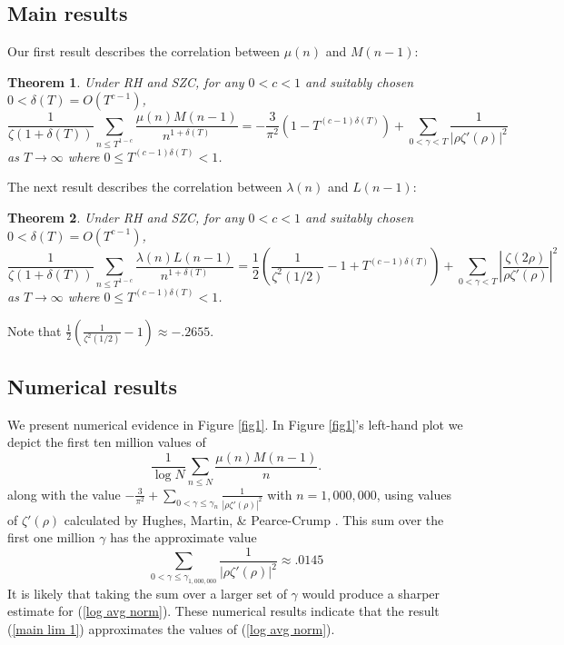 \documentclass[11pt,article]{amsart}
\numberwithin{equation}{section}
\newtheorem{thm}{Theorem}
\numberwithin{equation}{section}
\numberwithin{lemma}{section}
\numberwithin{prop}{section}
\begin{document}
\subsection{Main results}
Our first result describes the correlation between $\mu(n)$ and $M(n-1)$:
\begin{thm}
Under RH and SZC, for any $0<c<1$ and suitably chosen $0<\delta(T)=O\left(T^{c-1}\right)$, 
\begin{equation}
\frac{1}{\zeta\left(1+\delta(T)\right)}\sum_{n\leq T^{1-c}}\frac{\mu(n)M(n-1)}{n^{1+\delta(T)}}=-\frac{3}{\pi^{2}}\left(1-T^{(c-1)\delta(T)}\right)+\sum_{0<\gamma<T}\frac{1}{\left|\rho\zeta'(\rho)\right|^{2}} \label{main lim 1}
\end{equation}
as $T\rightarrow \infty$ where $0\leq T^{(c-1)\delta(T)}<1$.
\label{mainmainthm}
\end{thm}
\hspace{-.4cm}The next result describes the correlation between $\lambda(n)$ and $L(n-1)$:
\begin{thm}
Under RH and SZC, for any $0<c<1$ and suitably chosen $0<\delta(T)=O\left(T^{c-1}\right)$, 
\begin{equation}
\frac{1}{\zeta\left(1+\delta(T)\right)}\sum_{n\leq T^{1-c}}\frac{\lambda(n)L(n-1)}{n^{1+\delta(T)}}=\frac{1}{2}\left(\frac{1}{\zeta^{2}(1/2)}-1+T^{(c-1)\delta(T)}\right)+\sum_{0<\gamma<T}\left|\frac{\zeta(2\rho)}{\rho\zeta'(\rho)}\right|^{2} \label{main lim 2}
\end{equation}
as $T\rightarrow \infty$ where $0\leq T^{(c-1)\delta(T)}<1$.
\label{mainmainthm2}
\end{thm}
\hspace{-.4cm}Note that $\frac{1}{2}\left(\frac{1}{\zeta^{2}(1/2)}-1\right)\approx -.2655$. 


\subsection{Numerical results}
We present numerical evidence in Figure \ref{fig1}. In Figure \ref{fig1}'s left-hand plot we depict the first ten million values of 
\begin{equation}
\frac{1}{\log N}\sum_{n\leq N}\frac{\mu(n)M(n-1)}{n}. \label{log avg norm}
\end{equation}
along with the value $-\frac{3}{\pi^{2}}+\sum_{0<\gamma\leq\gamma_{n}}\frac{1}{\left|\rho\zeta'(\rho)\right|^{2}}$ with $n=1,000,000$, using values of $\zeta'(\rho)$ calculated by Hughes, Martin, \& Pearce-Crump \cite{hmpc}. This sum over the first one million $\gamma$ has the approximate value 
\begin{equation}
\sum_{0<\gamma\leq\gamma_{1,000,000}}\frac{1}{\left|\rho\zeta'(\rho)\right|^{2}} \approx .0145
\end{equation}
It is likely that taking the sum over a larger set of $\gamma$ would produce a sharper estimate for (\ref{log avg norm}). These numerical results indicate that the result (\ref{main lim 1}) approximates the values of (\ref{log avg norm}). 
\end{document}
